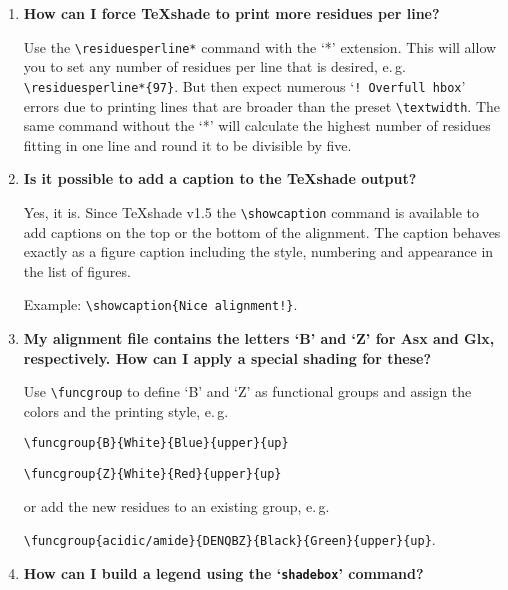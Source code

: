 \documentclass[12pt]{article}
\begin{document}
\begin{enumerate}

    \item
    
    \textbf{How can I force \TeX{}shade to print more residues per line?}
    
    Use the \verb|\residuesperline*| command with the `*' extension. 
    This will allow you to set any number of residues per line that is 
    desired, e.\,g. \verb|\residuesperline*{97}|. But then expect numerous 
    `\texttt{!\ Overfull hbox}' errors due to printing lines that 
    are broader than the preset \verb|\textwidth|. The same command 
    without the `*' will calculate the highest number of residues 
    fitting in one line and round it to be divisible by five.

    
    \item
    
    \textbf{Is it possible to add a caption to the \TeX{}shade output?}
    
    Yes, it is. Since \TeX{}shade v1.5 the \verb|\showcaption| 
    command is
    available to add captions on the top or the bottom of the
    alignment. The caption behaves exactly as a figure caption
    including the style, numbering and appearance in the list of 
    figures.
    \medskip
    
    Example: \verb|\showcaption{Nice alignment!}|.
    
    
    \item
    
    \textbf{My alignment file contains the letters `B' and `Z' for 
    Asx and Glx, respectively. How can I apply a special shading for 
    these?}
    
    Use \verb|\funcgroup| to define `B' and `Z' as functional groups 
    and assign the colors and the printing style, e.\,g.
    \medskip
    
    \verb|\funcgroup{B}{White}{Blue}{upper}{up}|
    \smallskip
    
    \verb|\funcgroup{Z}{White}{Red}{upper}{up}|
    \medskip
    
    or add the new residues to an existing group, e.\,g.
    \medskip
    
    \verb|\funcgroup{acidic/amide}{DENQBZ}{Black}{Green}{upper}{up}|.
  
    
    \item

    \textbf{How can I build a legend using the `\texttt{shadebox}' 
    command?}
    

\end{enumerate}
\end{document}
